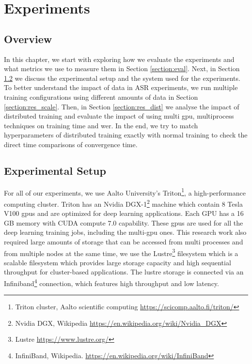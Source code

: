 \chapter{Experiments}
\label{chapter:evaluation}

\section{Overview}
In this chapter, we start with exploring how we evaluate the experiments and what metrics we use to measure them in Section \ref{section:eval}. Next, in Section \ref{section:trit} we discuss the experimental setup and the system used for the experiments. To better understand the impact of data in ASR experiments, we run multiple training configurations using different amounts of data in Section \ref{section:res_scale}. Then, in Section \ref{section:res_dist} we analyse the impact of distributed training and evaluate the impact of using multi \acrshort{gpu}, multiprocess techniques on training time and \acrshort{wer}. In the end, we try to match hyperparameters of distributed training exactly with normal training to check the direct time comparisons of convergence time. 


\section{Experimental Setup}
\label{section:trit}
For all of our experiments, we use Aalto University's Triton\footnote{Triton cluster, Aalto scientific computing \href{https://scicomp.aalto.fi/triton/}{https://scicomp.aalto.fi/triton/}}, a high-performance computing cluster. Triton has an Nvidia DGX-1\footnote{Nvidia DGX, Wikipedia \href{https://en.wikipedia.org/wiki/Nvidia_DGX}{https://en.wikipedia.org/wiki/Nvidia\_DGX}} machine which contain 8 Tesla V100 \acrshort{gpu}s and are optimized for deep learning applications. Each GPU has a 16 GB memory with CUDA compute 7.0 capability. These \acrshort{gpu}s are used for all the deep learning training jobs, including the multi-\acrshort{gpu} ones. This research work also required large amounts of storage that can be accessed from multi processes and from multiple nodes at the same time, we use the Lustre\footnote{Lustre \href{https://www.lustre.org/}{https://www.lustre.org/}} filesystem which is a scalable filesystem which provides large storage capacity and high sequential throughput for cluster-based applications. The lustre storage is connected via an Infiniband\footnote{InfiniBand, Wikipedia. \href{https://en.wikipedia.org/wiki/InfiniBand}{https://en.wikipedia.org/wiki/InfiniBand}} connection, which features high throughput and low latency.

